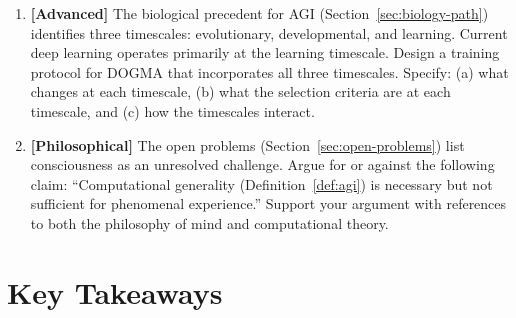 \begin{enumerate}[label=\textbf{16.\arabic*.}, leftmargin=2.5em]
\item \textbf{[Advanced]} The biological precedent for AGI (Section~\ref{sec:biology-path}) identifies three timescales: evolutionary, developmental, and learning. Current deep learning operates primarily at the learning timescale. Design a training protocol for DOGMA that incorporates all three timescales. Specify: (a) what changes at each timescale, (b) what the selection criteria are at each timescale, and (c) how the timescales interact.

\item \textbf{[Philosophical]} The open problems (Section~\ref{sec:open-problems}) list consciousness as an unresolved challenge. Argue for or against the following claim: ``Computational generality (Definition~\ref{def:agi}) is necessary but not sufficient for phenomenal experience.'' Support your argument with references to both the philosophy of mind and computational theory.

\end{enumerate}

\section{Key Takeaways}

